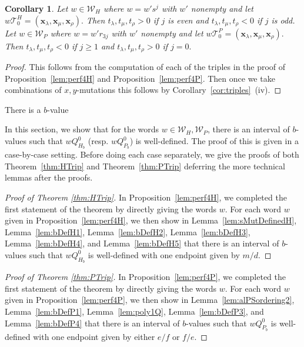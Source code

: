 \documentclass[11pt, reqno]{amsart}
\makeatletter
\def\subsection{\@startsection{subsection}{2}%
  \z@{.5\linespacing\@plus.7\linespacing}{-.5em}%
  {\normalfont\large\bfseries}}
\newtheorem{cor}[thm]{Corollary}
\theoremstyle{remark}
\numberwithin{equation}{subsection}
\numberwithin{figure}{section}
\theoremstyle{customremark}
\newcommand{\Tt}{\mathcal{T}}
\newcommand{\la}{{\lambda}}
\makeatother
\begin{document}
\begin{cor} \label{cor:signOfT}
    Let $w \in \mathcal{W}_H$ where $w=w's^j$ with $w'$ nonempty and let $w\Tt_0^H=(\bm{x}_\la,\bm{x}_\mu,\bm{x}_\rho).$ Then $t_\la,t_\mu,t_\rho>0$ if $j$ is even and $t_\la,t_\mu,t_\rho<0$ if $j$ is odd. Let $w \in \mathcal{W}_P$ where $w=w'r_{3j}$ with $w'$ nonempty and let $w\Tt_0^P=(\bm{x}_\la,\bm{x}_\mu,\bm{x}_\rho).$ Then $t_\la,t_\mu,t_\rho<0$ if $j \geq 1$ and $t_\la,t_\mu,t_\rho>0$ if $j=0.$
\end{cor}
\begin{proof}
    This follows from the computation of each of the triples in the proof of Proposition~\ref{lem:perf4H} and Proposition~\ref{lem:perf4P}. Then once we take combinations of $x,y$-mutations this follows by Corollary~\ref{cor:triples}~(iv). 
\end{proof}






\subsection{There is a \texorpdfstring{$b$}{b}-value}\label{ss:bValue}


In this section, we show that for the words $w \in \mathcal{W}_H,\mathcal{W}_P$, there is an interval of $b$-values such that $wQ_{H_b}^0$ (resp. $wQ_{P_b}^0$) is well-defined. The proof of this is given in a case-by-case setting. Before doing each case separately, we give the proofs of both Theorem~\ref{thm:HTrip} and Theorem~\ref{thm:PTrip} deferring the more technical lemmas after the proofs. 

\begin{proof}[Proof of Theorem \ref{thm:HTrip}]
In Proposition~\ref{lem:perf4H}, we completed the first statement of the theorem by directly giving the words $w$. For each word $w$ given in Proposition~\ref{lem:perf4H}, we then show in Lemma~\ref{lem:sMutDefinedH}, Lemma~\ref{lem:bDefH1}, Lemma~\ref{lem:bDefH2}, Lemma~\ref{lem:bDefH3}, Lemma~\ref{lem:bDefH4}, and Lemma~\ref{lem:bDefH5} that there is an interval of $b$-values such that $wQ_{H_b}^0$ is well-defined with one endpoint given by $m/d.$
\end{proof}

\begin{proof}[Proof of Theorem \ref{thm:PTrip}]
In Proposition~\ref{lem:perf4P}, we completed the first statement of the theorem by directly giving the words $w.$ For each word $w$ given in Proposition~\ref{lem:perf4P}, we then show in Lemma~\ref{lem:alPSordering2}, Lemma~\ref{lem:bDefP1}, Lemma~\ref{lem:poly1Q}, Lemma~\ref{lem:bDefP3}, and Lemma~\ref{lem:bDefP4} that there is an interval of $b$-values such that $wQ_{P_b}^0$ is well-defined with one endpoint given by either $e/f$ or $f/e.$
\end{proof}
\end{document}
